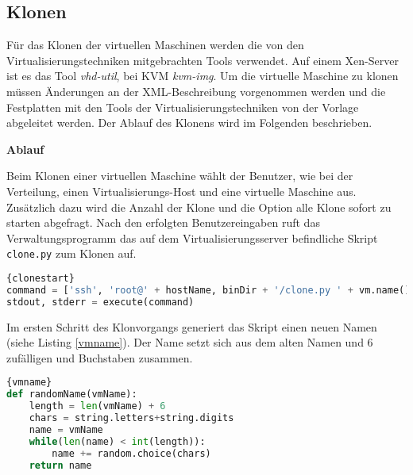\subsection{Klonen}
Für das Klonen der virtuellen Maschinen werden die von den Virtualisierungstechniken mitgebrachten Tools verwendet. Auf einem Xen-Server ist es das Tool \textit{vhd-util}, bei KVM \textit{kvm-img}. Um die virtuelle Maschine zu klonen müssen Änderungen an der XML-Beschreibung vorgenommen werden und die Festplatten mit den Tools der Virtualisierungstechniken von der Vorlage abgeleitet werden. Der Ablauf des Klonens wird im Folgenden beschrieben.  %

\textbf{Ablauf}

Beim Klonen einer virtuellen Maschine wählt der Benutzer, wie bei der Verteilung, einen Virtualisierungs-Host und eine virtuelle Maschine aus. Zusätzlich dazu wird die Anzahl der Klone und die Option alle Klone sofort zu starten abgefragt. Nach den erfolgten Benutzereingaben ruft das Verwaltungsprogramm das auf dem Virtualisierungsserver befindliche Skript \lstinline|clone.py| zum Klonen auf.
\\
\begin{lstlisting}[caption=Starten des Klonvorgangs,language=Python,label=clonestart]{clonestart}
command = ['ssh', 'root@' + hostName, binDir + '/clone.py ' + vm.name() + ' ' + cloneCount + ' ' + autostart + ' ' + str(debug)]
stdout, stderr = execute(command)
\end{lstlisting}

Im ersten Schritt des Klonvorgangs generiert das Skript einen neuen Namen (siehe Listing \ref{vmname}). Der Name setzt sich aus dem alten Namen und 6 zufälligen und Buchstaben zusammen.
\\
\begin{lstlisting}[caption=Erstellen des Namens der VM,language=Python, label=vmname]{vmname}
def randomName(vmName):
	length = len(vmName) + 6
	chars = string.letters+string.digits
	name = vmName
	while(len(name) < int(length)):
		name += random.choice(chars)
	return name
\end{lstlisting}

